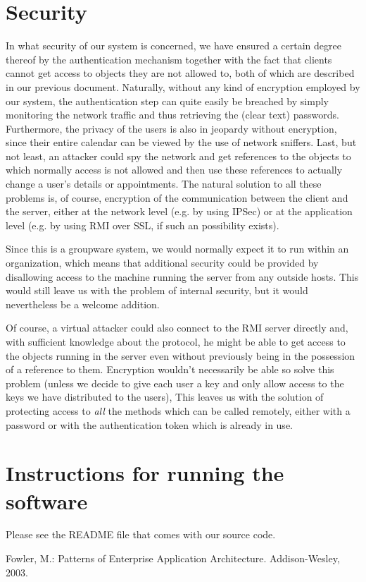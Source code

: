\documentclass[a4paper,10pt]{article}
\begin{document}
\section{Security}

In what security of our system is concerned, we have ensured a certain degree thereof
by the authentication mechanism together with the fact that clients cannot get access
to objects they are not allowed to, both of which are described in our previous document.
Naturally, without any kind of encryption employed by our system, the authentication
step can quite easily be breached by simply monitoring the network traffic and thus
retrieving the (clear text) passwords. Furthermore, the privacy of the users is also
in jeopardy without encryption, since their entire calendar can be viewed by the use
of network sniffers. Last, but not least, an attacker could spy the network and get
references to the objects to which normally access is not allowed and then use these
references to actually change a user's details or appointments. The natural solution
to all these problems is, of course, encryption of the communication between the client
and the server, either at the network level (e.g. by using IPSec) or at the application
level (e.g. by using RMI over SSL, if such an possibility exists).

Since this is a groupware system, we would normally expect it to run within an
organization, which means that additional security could be provided by disallowing access
to the machine running the server from any outside hosts. This would still leave us
with the problem of internal security, but it would nevertheless be a welcome addition.

Of course, a virtual attacker could also connect to the RMI server directly and, with
sufficient knowledge about the protocol, he might be able to get access to the objects
running in the server even without previously being in the possession of a reference
to them. Encryption wouldn't necessarily be able so solve this problem (unless we decide
to give each user a key and only allow access to the keys we have distributed to the users),
This leaves us with the solution of protecting access to \emph{all} the methods which
can be called remotely, either with a password or with the authentication token which
is already in use.

\section{Instructions for running the software}

Please see the README file that comes with our source code.

\begin{thebibliography}{99}

 Fowler, M.: Patterns of Enterprise Application Architecture. Addison-Wesley, 2003.

\end{thebibliography}
\end{document}
